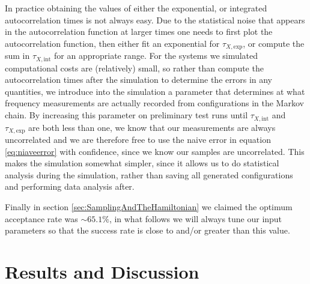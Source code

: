 \documentclass[12pt]{article}
\begin{document}
            In practice obtaining the values of either the exponential, or integrated autocorrelation times is not always easy. Due to the statistical noise that appears in the autocorrelation function at larger times one needs to first plot the autocorrelation function, then either fit an exponential for $\tau_{X,\text{exp}}$, or compute the sum in $\tau_{X,\text{int}}$ for an appropriate range. For the systems we simulated computational costs are (relatively) small, so rather than compute the autocorrelation times after the simulation to determine the errors in any quantities, we introduce into the simulation a parameter that determines at what frequency measurements are actually recorded from configurations in the Markov chain. By increasing this parameter on preliminary test runs until $\tau_{X,\text{int}}$ and $\tau_{X,\text{exp}}$ are both less than one, we know that our measurements are always uncorrelated and we are therefore free to use the naive error in equation \ref{eq:niaveerror} with confidence, since we know our samples are uncorrelated. This makes the simulation somewhat simpler, since it allows us to do statistical analysis during the simulation, rather than saving all generated configurations and performing data analysis after. 

            Finally in section \ref{sec:SamplingAndTheHamiltonian} we claimed the optimum acceptance rate was $\sim 65.1\%$, in what follows we will always tune our input parameters so that the success rate is close to and/or greater than this value.

            
\section{Results and Discussion}
\end{document}
